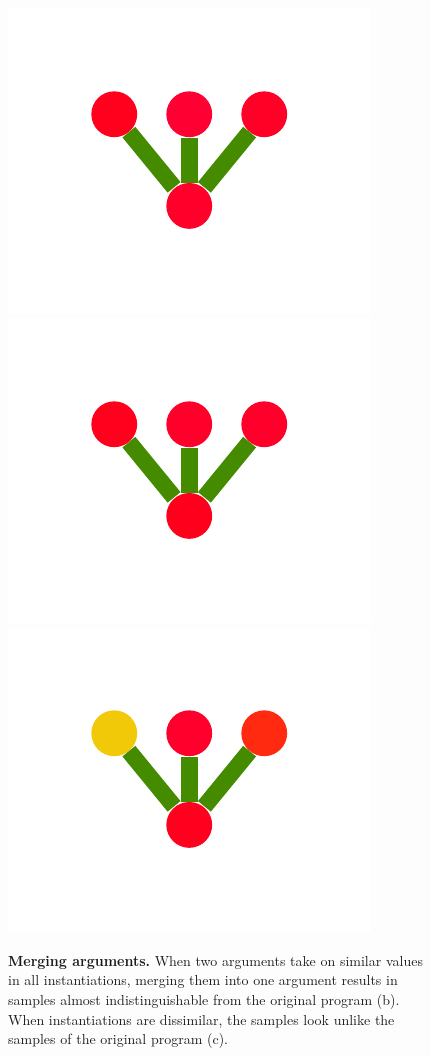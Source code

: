 \documentclass[a4paper,10pt]{article}
\begin{document}
\begin{figure}
{    \includegraphics[scale=.26]{../figures/vector/4-2-2-mergeprog-bad-6.pdf}
    \includegraphics[scale=.26]{../figures/vector/4-2-2-mergeprog-bad-7.pdf}
    \includegraphics[scale=.26]{../figures/vector/4-2-2-mergeprog-bad-8.pdf}
    \label{fig:merge-bad}        
    }
  \caption{{\bf Merging arguments.} When two arguments take on similar values in all instantiations, merging them into one argument results in samples almost indistinguishable from the original program (b). When instantiations are dissimilar, the samples look unlike the samples of the original program (c).}
\end{figure}
\end{document}
